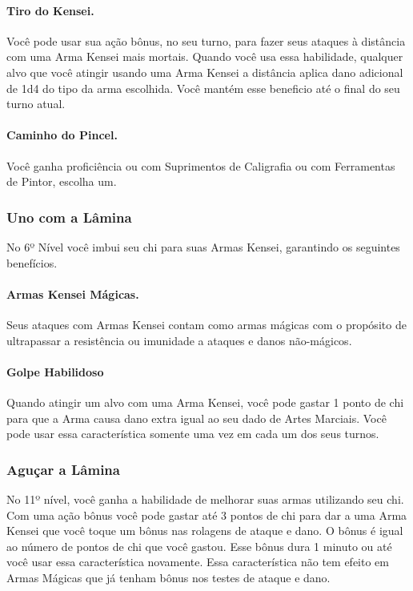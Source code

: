 \begin{multicols}{2}
\paragraph{Tiro do Kensei.}%
Você pode usar sua ação bônus, no seu turno, para fazer seus ataques à distância
com uma Arma Kensei mais mortais. Quando você usa essa habilidade, qualquer alvo
que você atingir usando uma Arma Kensei a distância aplica dano adicional de 1d4
do tipo da arma escolhida. Você mantém esse beneficio até o final do seu turno
atual.

\paragraph{Caminho do Pincel.}%
Você ganha proficiência ou com Suprimentos de Caligrafia ou com Ferramentas de
Pintor, escolha um.

\subsubsection*{Uno com a Lâmina}%
\label{ssub:uno_com_a_lamina}

No 6º Nível você imbui seu chi para suas Armas Kensei, garantindo os seguintes
benefícios.

\paragraph{Armas Kensei Mágicas.}%
Seus ataques com Armas Kensei contam como armas mágicas com o propósito de
ultrapassar a resistência ou imunidade a ataques e danos não-mágicos.

\paragraph{Golpe Habilidoso}%
Quando atingir um alvo com uma Arma Kensei, você pode gastar 1 ponto de chi para
que a Arma causa dano extra igual ao seu dado de Artes Marciais. Você pode usar
essa característica somente uma vez em cada um dos seus turnos.

\subsubsection*{Aguçar a Lâmina}%
\label{ssub:agucar_a_lamina}

No 11º nível, você ganha a habilidade de melhorar suas armas utilizando seu chi.
Com uma ação bônus você pode gastar até 3 pontos de chi para dar a uma Arma
Kensei que você toque um bônus nas rolagens de ataque e dano. O bônus é igual
ao número de pontos de chi que você gastou. Esse bônus dura 1 minuto ou até você
usar essa característica novamente. Essa característica não tem efeito em Armas
Mágicas que já tenham bônus nos testes de ataque e dano.


\end{multicols}
